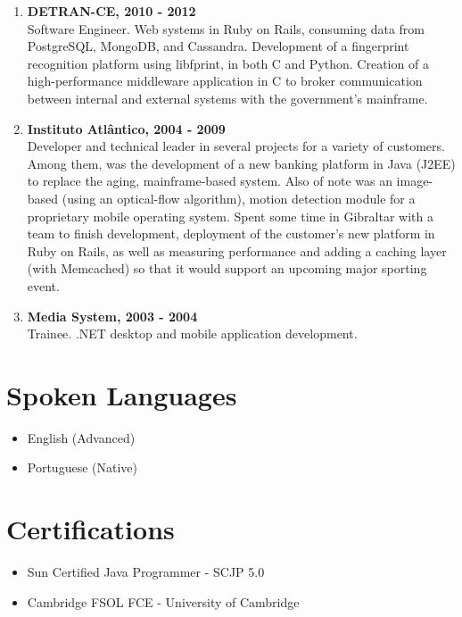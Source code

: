 \documentclass[letterpaper]{article}
\begin{document}
\begin{enumerate}
  \item
  \textbf{DETRAN-CE, 2010 - 2012} \\
  Software Engineer. Web systems in Ruby on Rails, consuming data from PostgreSQL, MongoDB, and Cassandra. Development of a fingerprint recognition platform using libfprint, in both C and Python. Creation of a high-performance middleware application in C to broker communication between internal and external systems with the government's mainframe.
  \item
  \textbf{Instituto Atlântico, 2004 - 2009 } \\
  Developer and technical leader in several projects for a variety of customers. Among them, was the development of a new banking platform in Java (J2EE) to replace the aging, mainframe-based system. Also of note was an image-based (using an optical-flow algorithm), motion detection module for a proprietary mobile operating system. Spent some time in Gibraltar with a team to finish development, deployment of the customer's new platform in Ruby on Rails, as well as measuring performance and adding a caching layer (with Memcached) so that it would support an upcoming major sporting event.
  \item
  \textbf{Media System, 2003 - 2004} \\
  Trainee. .NET desktop and mobile application development.
\end{enumerate}

\bigskip

\section*{Spoken Languages}
\begin{itemize}
  \item English (Advanced)
  \item Portuguese (Native)
\end{itemize}

\section*{Certifications}
\begin{itemize}
  \item Sun Certified Java Programmer - SCJP 5.0
  \item Cambridge FSOL FCE - University of Cambridge
\end{itemize}
\end{document}
